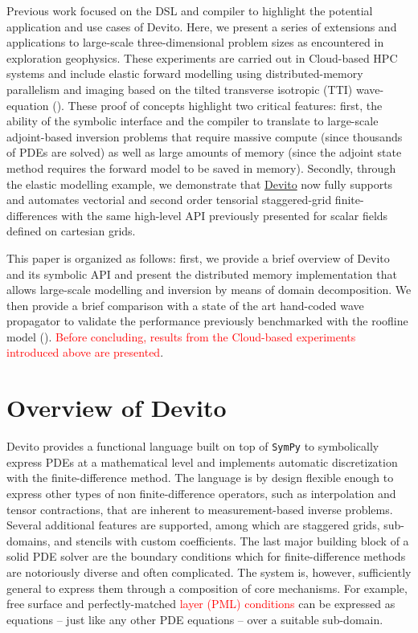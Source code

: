 \documentclass[10pt, conference]{IEEEtran}
\newcommand{\devito}{\href{https://github.com/devitocodes/devito}{Devito} }
\begin{document}
Previous work focused on the DSL and compiler to highlight the potential
application and use cases of Devito. Here, we present a series of
extensions and applications to large-scale three-dimensional problem sizes
as encountered in exploration geophysics. These experiments are carried
out in Cloud-based HPC systems and include elastic forward modelling using
distributed-memory parallelism and imaging based on the tilted transverse
isotropic (TTI) wave-equation (\cite{virieux, thomsen1986, zhang-tti,
duveneck, louboutin2018segeow}). These proof of concepts highlight two
critical features: first, the ability of the symbolic interface and the
compiler to translate to large-scale adjoint-based inversion problems that
require massive compute (since thousands of PDEs are solved) as well as
large amounts of memory (since the adjoint state method requires the
forward model to be saved in memory). Secondly, through the elastic
modelling example, we demonstrate that \devito now fully supports and
automates vectorial and second order tensorial staggered-grid
finite-differences with the same high-level API previously presented for
scalar fields defined on cartesian grids.

This paper is organized as follows: first, we provide a brief overview of
Devito and its symbolic API and present the distributed memory
implementation that allows large-scale modelling and inversion by means of
domain decomposition. We then provide a brief comparison with a state of
the art hand-coded wave propagator to validate the performance previously
benchmarked with the roofline model (\cite{patterson, devito-compiler,
devito-api, louboutin2016ppf}). \textcolor{red}{Before concluding, results from the
Cloud-based experiments introduced above are presented}.

\section{Overview of Devito}\label{overview-of-devito}

Devito \cite{devito-api} provides a functional language built on top of
\texttt{SymPy} \cite{sympy} to symbolically express PDEs at a
mathematical level and implements automatic discretization with the
finite-difference method. The language is by design flexible enough to
express other types of non finite-difference operators, such as
interpolation and tensor contractions, that are inherent to
measurement-based inverse problems. Several additional features are
supported, among which are staggered grids, sub-domains, and stencils with
custom coefficients. The last major building block of a solid PDE solver
are the boundary conditions which for finite-difference methods are
notoriously diverse and often complicated. The system is, however,
sufficiently general to express them through a composition of core
mechanisms. For example, free surface and perfectly-matched \textcolor{red}{layer
(PML) conditions} can be expressed as equations -- just like
any other PDE equations -- over a suitable sub-domain.
\end{document}
